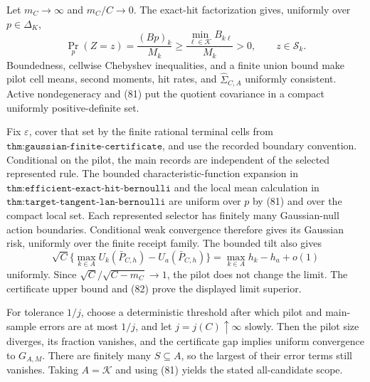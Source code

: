 Let \(m_C\to\infty\) and \(m_C/C\to0\).  The exact-hit factorization gives, uniformly over \(p\in\Delta_K\),
\[
\Pr_p(Z=z)=\frac{(Bp)_k}{M_k}\geq
\frac{\min_{\ell\in\mathcal K}B_{k\ell}}{M_k}>0,
\qquad z\in\mathcal S_k. \tag{81}
\]
Boundedness, cellwise Chebyshev inequalities, and a finite union bound make pilot cell means, second moments, hit rates, and \(\widehat\Sigma_{C,A}\) uniformly consistent.  Active nondegeneracy and (81) put the quotient covariance in a compact uniformly positive-definite set.

Fix \(\varepsilon\), cover that set by the finite rational terminal cells from \(\texttt{thm:gaussian-finite-certificate}\), and use the recorded boundary convention.  Conditional on the pilot, the main records are independent of the selected represented rule.  The bounded characteristic-function expansion in \(\texttt{thm:efficient-exact-hit-bernoulli}\) and the local mean calculation in \(\texttt{thm:target-tangent-lan-bernoulli}\) are uniform over \(p\) by (81) and over the compact local set.  Each represented selector has finitely many Gaussian-null action boundaries.  Conditional weak convergence therefore gives its Gaussian risk, uniformly over the finite receipt family.  The bounded tilt also gives
\[
\sqrt C\{\max_{k\in A}U_k(\bar P_{C,h})-U_a(\bar P_{C,h})\}
=\max_{k\in A}h_k-h_a+o(1) \tag{82}
\]
uniformly.  Since \(\sqrt C/\sqrt{C-m_C}\to1\), the pilot does not change the limit.  The certificate upper bound and (82) prove the displayed limit superior.

For tolerance \(1/j\), choose a deterministic threshold after which pilot and main-sample errors are at most \(1/j\), and let \(j=j(C)\uparrow\infty\) slowly.  Then the pilot size diverges, its fraction vanishes, and the certificate gap implies uniform convergence to \(G_{A,M}\).  There are finitely many \(S\subseteq A\), so the largest of their error terms still vanishes.  Taking \(A=\mathcal K\) and using (81) yields the stated all-candidate scope.